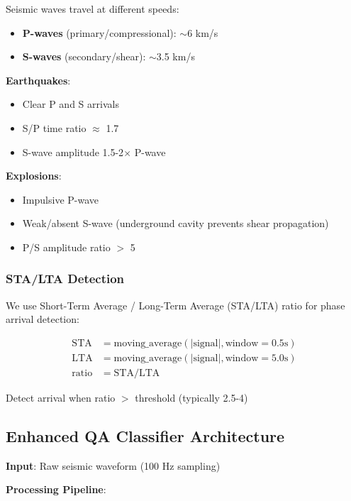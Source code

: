 \documentclass[11pt]{article}
\theoremstyle{remark}
\begin{document}
Seismic waves travel at different speeds:
\begin{itemize}
\item \textbf{P-waves} (primary/compressional): $\sim$6 km/s
\item \textbf{S-waves} (secondary/shear): $\sim$3.5 km/s
\end{itemize}

\textbf{Earthquakes}:
\begin{itemize}
\item Clear P and S arrivals
\item S/P time ratio $\approx$ 1.7
\item S-wave amplitude 1.5-2$\times$ P-wave
\end{itemize}

\textbf{Explosions}:
\begin{itemize}
\item Impulsive P-wave
\item Weak/absent S-wave (underground cavity prevents shear propagation)
\item P/S amplitude ratio $>$ 5
\end{itemize}

\subsubsection{STA/LTA Detection}

We use Short-Term Average / Long-Term Average (STA/LTA) ratio for phase arrival detection:

\begin{align}
\text{STA} &= \text{moving\_average}(|\text{signal}|, \text{window}=0.5\text{s}) \\
\text{LTA} &= \text{moving\_average}(|\text{signal}|, \text{window}=5.0\text{s}) \\
\text{ratio} &= \text{STA} / \text{LTA}
\end{align}

Detect arrival when ratio $>$ threshold (typically 2.5-4)

\subsection{Enhanced QA Classifier Architecture}

\textbf{Input}: Raw seismic waveform (100 Hz sampling)

\textbf{Processing Pipeline}:
\end{document}
